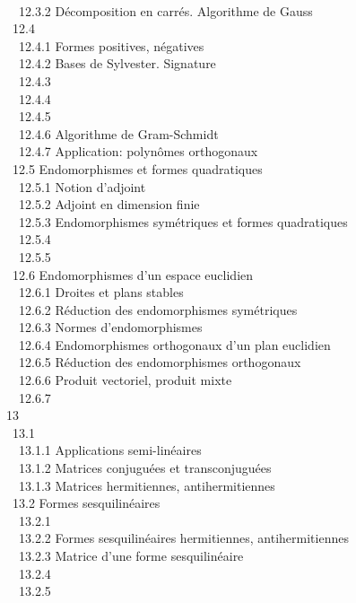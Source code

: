 \documentclass[]{article}
\begin{document}
\\ ~~12.3.2 {Décomposition en
carrés. Algorithme de Gauss} \\ ~12.4
 \\
~~12.4.1 {Formes positives,
négatives} \\ ~~12.4.2 {Bases de
Sylvester. Signature} \\ ~~12.4.3
 \\ ~~12.4.4
 \\
~~12.4.5  \\
~~12.4.6 {Algorithme de
Gram-Schmidt} \\ ~~12.4.7
{Application: polynômes
orthogonaux} \\ ~12.5
{Endomorphismes et formes
quadratiques} \\ ~~12.5.1 {Notion
d'adjoint} \\ ~~12.5.2 {Adjoint
en dimension finie} \\ ~~12.5.3
{Endomorphismes symétriques et
formes quadratiques} \\ ~~12.5.4
 \\ ~~12.5.5
 \\ ~12.6
{Endomorphismes d'un espace
euclidien} \\ ~~12.6.1 {Droites
et plans stables} \\ ~~12.6.2
{Réduction des endomorphismes
symétriques} \\ ~~12.6.3 {Normes
d'endomorphismes} \\ ~~12.6.4
{Endomorphismes orthogonaux d'un
plan euclidien} \\ ~~12.6.5
{Réduction des endomorphismes
orthogonaux} \\ ~~12.6.6 {Produit
vectoriel, produit mixte} \\ ~~12.6.7
 \\ 13
 \\ ~13.1
 \\
~~13.1.1 {Applications
semi-linéaires} \\ ~~13.1.2
{Matrices conjuguées et
transconjuguées} \\ ~~13.1.3
{Matrices hermitiennes,
antihermitiennes} \\ ~13.2 {Formes
sesquilinéaires} \\ ~~13.2.1
 \\ ~~13.2.2
{Formes sesquilinéaires
hermitiennes, antihermitiennes} \\ ~~13.2.3
{Matrice d'une forme
sesquilinéaire} \\ ~~13.2.4
 \\
~~13.2.5  \\
\end{document}
